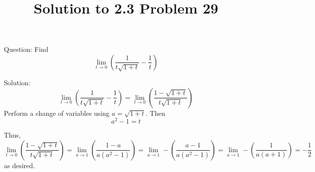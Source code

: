 \documentclass[12pt]{article}
\title{Solution to 2.3 Problem 29}
\theoremstyle{remark}
\begin{document}
\maketitle

Question: Find $$ \lim_{t \rightarrow 0} (\frac{1}{t\sqrt{1+t}} - \frac{1}{t}) $$

Solution: $$ \lim_{t \rightarrow 0} (\frac{1}{t\sqrt{1+t}} - \frac{1}{t}) = 
\lim_{t \rightarrow 0} (\frac{1 - \sqrt{1+t}}{t\sqrt{1+t}}) 
$$
Perform a change of variables using $a = \sqrt{1+t}$. Then $$ a^2 - 1 = t $$

Thus, 
$$\lim_{t \rightarrow 0} (\frac{1 - \sqrt{1+t}}{t\sqrt{1+t}}) = \lim_{a \rightarrow 1} (\frac{1 - a}{a(a^2-1)})  = \lim_{a \rightarrow 1} -(\frac{a - 1}{a(a^2-1)}) = 
\lim_{a \rightarrow 1} -(\frac{1}{a(a+1)}) = -\frac{1}{2}$$ as desired.
\end{document}
